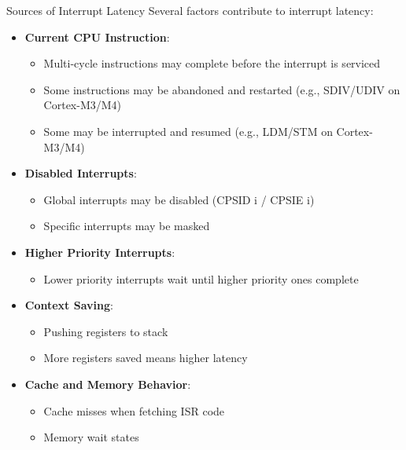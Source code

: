 \begin{concept}{Sources of Interrupt Latency}
Several factors contribute to interrupt latency:
\begin{itemize}
    \item \textbf{Current CPU Instruction}:
    \begin{itemize}
        \item Multi-cycle instructions may complete before the interrupt is serviced
        \item Some instructions may be abandoned and restarted (e.g., SDIV/UDIV on Cortex-M3/M4)
        \item Some may be interrupted and resumed (e.g., LDM/STM on Cortex-M3/M4)
    \end{itemize}
    \item \textbf{Disabled Interrupts}:
    \begin{itemize}
        \item Global interrupts may be disabled (CPSID i / CPSIE i)
        \item Specific interrupts may be masked
    \end{itemize}
    \item \textbf{Higher Priority Interrupts}:
    \begin{itemize}
        \item Lower priority interrupts wait until higher priority ones complete
    \end{itemize}
    \item \textbf{Context Saving}:
    \begin{itemize}
        \item Pushing registers to stack
        \item More registers saved means higher latency
    \end{itemize}
    \item \textbf{Cache and Memory Behavior}:
    \begin{itemize}
        \item Cache misses when fetching ISR code
        \item Memory wait states
    \end{itemize}
\end{itemize}
\end{concept}

